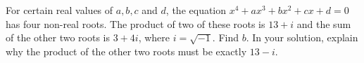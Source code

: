 For certain real values of $a,b,c$ and $d$, the equation $x^4+ax^3+bx^2+cx+d=0$ has four non-real roots. The product of two of these roots is $13+i$ and the sum of the other two roots is $3+4i$, where $i=\sqrt{-1}$. Find $b$. In your solution, explain why the product of the other two roots must be exactly $13-i$.
